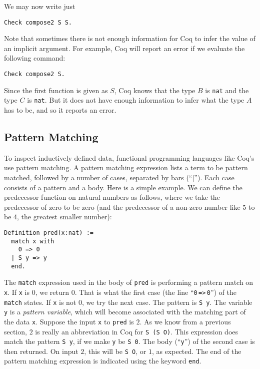 \documentclass{book}[12pt]
\begin{document}
\noindent We may now write just

\begin{verbatim}
Check compose2 S S.
\end{verbatim}

\noindent Note that sometimes there is not enough information for Coq
to infer the value of an implicit argument.  For example, Coq will report
an error if we evaluate the following command:

\begin{verbatim}
Check compose2 S.
\end{verbatim}

\noindent Since the first function is given as $S$, Coq knows that
the type $B$ is \texttt{nat} and the type $C$ is \texttt{nat}.  But
it does not have enough information to infer what the type $A$ has to
be, and so it reports an error.

\subsection{Pattern Matching}

To inspect inductively defined data, functional programming languages
like Coq's use pattern matching.  A pattern matching expression lists
a term to be pattern matched, followed by a number of cases, separated
by bars (``$|$'').  Each case consists of a pattern and a body.  Here
is a simple example.  We can define the predecessor function on
natural numbers as follows, where we take the predecessor of zero to
be zero (and the predecessor of a non-zero number like $5$ to be $4$,
the greatest smaller number):

\begin{verbatim}
Definition pred(x:nat) := 
  match x with
    0 => 0
  | S y => y
  end.
\end{verbatim}

\noindent The \texttt{match} expression used in the body of
\texttt{pred} is performing a pattern match on \texttt{x}.  If
\texttt{x} is $0$, we return $0$.  That is what the first case (the
line ``\texttt{0}\,\texttt{=>}\,\texttt{0}'') of the \texttt{match}
states.  If \texttt{x} is not $0$, we try the next case.  The pattern
is \texttt{S y}.  The variable \texttt{y} is a \emph{pattern
variable}, which will become associated with the matching part of the
data \texttt{x}.  Suppose the input \texttt{x} to \texttt{pred} is
$2$.  As we know from a previous section, $2$ is really an
abbreviation in Coq for \texttt{S\ (S\ O)}.  This expression does
match the pattern \texttt{S\ y}, if we make \texttt{y} be \texttt{S\
0}.  The body (``\texttt{y}'') of the second case is then returned.  On
input $2$, this will be \texttt{S\ O}, or $1$, as expected.  The end
of the pattern matching expression is indicated using the keyword
\texttt{end}.
\end{document}
